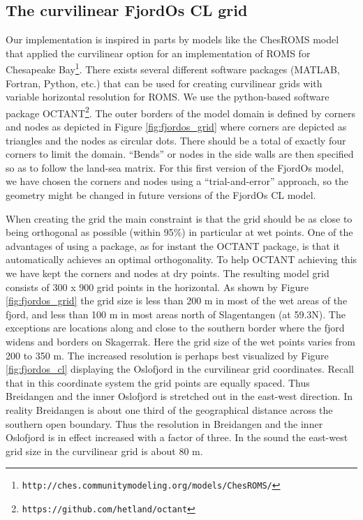 \subsection{The curvilinear FjordOs CL grid}
Our implementation is inspired in parts by models like the ChesROMS model that applied the curvilinear option for an implementation of ROMS for Chesapeake Bay\footnote{\texttt{http://ches.communitymodeling.org/models/ChesROMS/}}. There exists several different software packages (MATLAB, Fortran, Python, etc.) that can be used for creating curvilinear grids with variable horizontal resolution for ROMS. We use the python-based software package OCTANT\footnote{\texttt{https://github.com/hetland/octant}}. The outer borders of the model domain is defined by corners and nodes as depicted in Figure \ref{fig:fjordos_grid} where corners are depicted as triangles and the nodes as circular dots. There should be a total of exactly four corners to limit the domain. ``Bends'' or nodes in the side walls are then specified so as to follow the land-sea matrix. For this first version of the FjordOs model, we have chosen the corners and nodes using a ``trial-and-error'' approach, so the geometry might be changed in future versions of the FjordOs CL model.


When creating the grid the main constraint is that the grid should be as close to being orthogonal as possible (within 95\%) in particular at wet points. One of the advantages of using a package, as for instant the OCTANT package, is that it automatically achieves an optimal orthogonality. To help OCTANT achieving this we have kept the corners and nodes at dry points. The resulting model grid consists of 300 x 900 grid points in the horizontal. As shown by Figure \ref{fig:fjordos_grid} the grid size is less than 200 m in most of the wet areas of the fjord, and less than 100 m in most areas north of Slagentangen (at 59.3N). The exceptions are locations along and close to the southern border where the fjord widens and borders on Skagerrak. Here the grid size of the wet points varies from 200 to 350 m. The increased resolution is perhaps best visualized by Figure \ref{fig:fjordos_cl} displaying the Oslofjord in the curvilinear grid coordinates. Recall that in this coordinate system the grid points are equally spaced. Thus Breidangen and the inner Oslofjord is stretched out in the east-west direction. In reality Breidangen is about one third of the geographical distance across the southern open boundary. Thus the resolution in Breidangen and the inner Oslofjord is in effect increased with a factor of three. In the {\DR} sound the east-west grid size in the curvilinear grid is about 80 m.  


